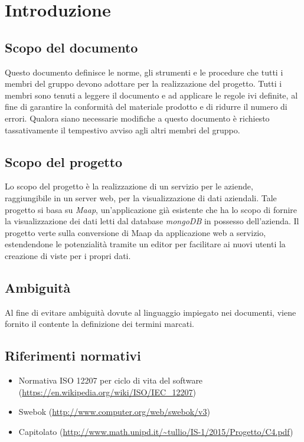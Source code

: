 \section{Introduzione}
\subsection{Scopo del documento}
Questo documento definisce le norme, gli strumenti e le procedure che tutti i membri del gruppo devono adottare per la realizzazione del progetto. Tutti i membri sono tenuti a leggere il documento e ad applicare le regole ivi definite, al fine di garantire la conformità del materiale prodotto e di ridurre il numero di errori. Qualora siano necessarie modifiche a questo documento è richiesto tassativamente il tempestivo avviso agli altri membri del gruppo.


\subsection{Scopo del progetto}
Lo scopo del progetto è la realizzazione di un servizio per le aziende, raggiungibile in un server web, per la visualizzazione di dati aziendali. Tale progetto si basa su \textit{Maap}, un'applicazione già esistente che ha lo scopo di fornire la visualizzazione dei dati letti dal database \textit{mongoDB} in possesso dell'azienda. Il progetto verte sulla conversione di Maap da applicazione web a servizio, estendendone le potenzialità tramite un editor per facilitare ai nuovi utenti la creazione di viste per i propri dati.

\subsection{Ambiguit\`a}
Al fine di evitare ambiguità dovute al linguaggio impiegato nei documenti, viene fornito il \Glossario contente la definizione dei termini marcati.


\subsection{Riferimenti normativi}
\begin{itemize}
\item Normativa ISO 12207 per ciclo di vita del software (\url{https://en.wikipedia.org/wiki/ISO/IEC_12207})
\item Swebok (\url{http://www.computer.org/web/swebok/v3})
\item Capitolato (\url{http://www.math.unipd.it/~tullio/IS-1/2015/Progetto/C4.pdf})
\end{itemize}


